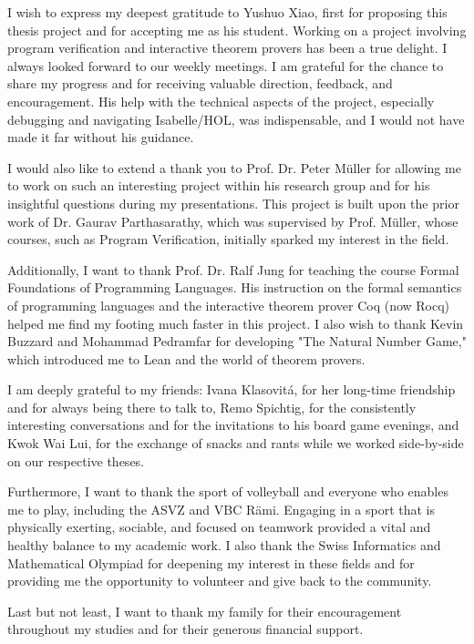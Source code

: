 \documentclass[11pt]{article}
\begin{document}
I wish to express my deepest gratitude to Yushuo Xiao,
first for proposing this thesis project and for accepting me as his student.
Working on a project involving program verification and interactive theorem provers has been a true delight.
I always looked forward to our weekly meetings.
I am grateful for the chance to share my progress and for receiving valuable direction, feedback, and encouragement.
His help with the technical aspects of the project,
especially debugging and navigating Isabelle/HOL, was indispensable,
and I would not have made it far without his guidance.

I would also like to extend a thank you to Prof. Dr. Peter Müller for allowing me to work on such an interesting project
within his research group and for his insightful questions during my presentations.
This project is built upon the prior work of Dr. Gaurav Parthasarathy,
which was supervised by Prof. Müller, whose courses,
such as Program Verification, initially sparked my interest in the field.

Additionally, I want to thank Prof. Dr. Ralf Jung for teaching the course Formal Foundations of Programming Languages.
His instruction on the formal semantics of programming languages and the interactive theorem prover Coq (now Rocq) helped me find my footing much faster in this project.
I also wish to thank Kevin Buzzard and Mohammad Pedramfar for developing "The Natural Number Game,"
which introduced me to Lean and the world of theorem provers.

I am deeply grateful to my friends: Ivana Klasovitá, for her long-time friendship 
and for always being there to talk to,
Remo Spichtig, for the consistently interesting conversations and for the invitations to his board game evenings,
and Kwok Wai Lui, for the exchange of snacks and rants while we worked side-by-side on our respective theses.

Furthermore, I want to thank the sport of volleyball and everyone who enables me to play, including the ASVZ and VBC Rämi.
Engaging in a sport that is physically exerting, sociable, and focused on teamwork provided a vital and healthy balance to my academic work.
I also thank the Swiss Informatics and Mathematical Olympiad for deepening my interest in these fields and for providing me the opportunity to volunteer and give back to the community.

Last but not least, I want to thank my family for their encouragement throughout my studies and for their generous financial support.
\end{document}
